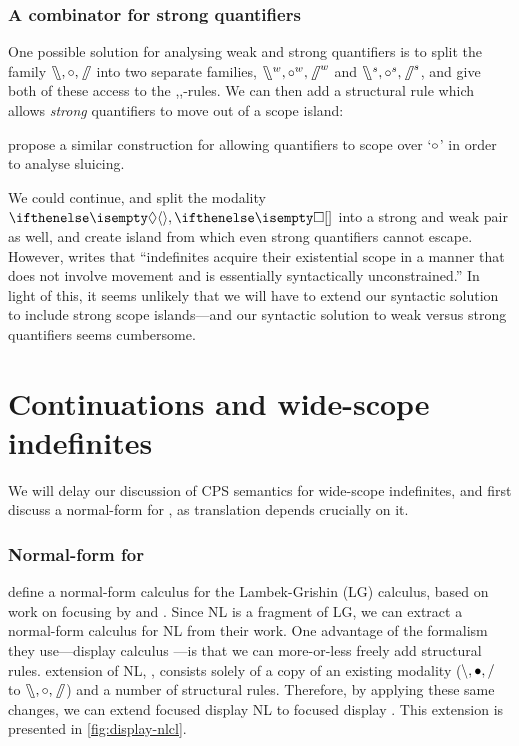 \documentclass[10pt,a4paper]{llncs}
\begin{document}
\subsubsection*{A combinator for strong quantifiers}
One possible solution for analysing weak and strong quantifiers is to
split the family $\fatbslash,\mathbin{\circ},\mathbin{\!\fatslash\,}$ into two separate families,
$\fatbslash^w,\mathbin{\circ}^w,\mathbin{\!\fatslash\,}^w$ and $\fatbslash^s,\mathbin{\circ}^s,\mathbin{\!\fatslash\,}^s$, and
give both of these access to the \I,\B,\C-rules. We can then add a
structural rule which allows \emph{strong} quantifiers to move out of
a scope island:
\vspace*{-1\baselineskip}
\begin{center}
  \begin{scprooftree*}
    \doubleLine\RightLabel{$\I^*$}
  \end{scprooftree*}
\end{center}
\citet[][ch.\ 17.11]{barker2015} propose a similar construction for
allowing quantifiers to scope over `$\mathbin{\circ}$' in order to analyse
sluicing.

We could continue, and split the modality $\di,\sq$ into a strong and
weak pair as well, and create island from which even strong
quantifiers cannot escape. However, \citet{szabolcsi2000} writes that
``indefinites acquire their existential scope in a manner that does
not involve movement and is essentially syntactically unconstrained.''
In light of this, it seems unlikely that we will have to extend our
syntactic solution to include strong scope islands---and our syntactic
solution to weak versus strong quantifiers seems cumbersome.


\section{Continuations and wide-scope indefinites}
We will delay our discussion of CPS semantics for wide-scope
indefinites, and first discuss a normal-form for \NLCL, as
 translation depends crucially on it.

\subsubsection*{Normal-form for \NLCL}
\label{sec:normal-form}
\citet[][sec. 3.1]{moortgat2012} define a normal-form calculus for the
Lambek-Grishin (LG) calculus, based on work on focusing by
\citet{andreoli2001} and \citet{bastenhof2011}.
Since NL is a fragment of LG, we can extract a normal-form calculus
for NL from their work. One advantage of the formalism they
use---display calculus \citep{belnap1982}---is that we can
more-or-less freely add structural rules.
 extension of NL, \NLCL, consists solely of a copy
of an existing modality ($\backslash,\bullet,\slash$ to $\fatbslash,\mathbin{\circ},\mathbin{\!\fatslash\,}$)
and a number of structural rules. Therefore, by applying these same
changes, we can extend focused display NL to focused display \NLCL.
This extension is presented in \autoref{fig:display-nlcl}.
\end{document}
